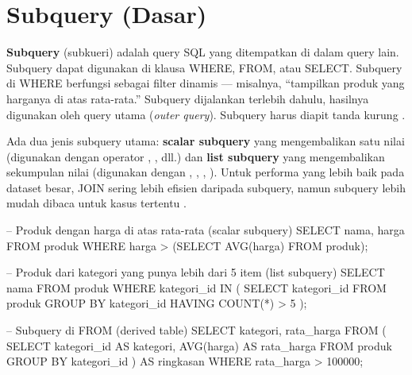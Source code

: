 \section{Subquery (Dasar)}

\textbf{Subquery} (subkueri) adalah query SQL yang ditempatkan di dalam query lain. Subquery dapat digunakan di klausa WHERE, FROM, atau SELECT. Subquery di WHERE berfungsi sebagai filter dinamis --- misalnya, ``tampilkan produk yang harganya di atas rata-rata.'' Subquery dijalankan terlebih dahulu, hasilnya digunakan oleh query utama (\textit{outer query}). Subquery harus diapit tanda kurung \cite{mysqlDocs}.

Ada dua jenis subquery utama: \textbf{scalar subquery} yang mengembalikan satu nilai (digunakan dengan operator \code{=}, \code{>}, dll.) dan \textbf{list subquery} yang mengembalikan sekumpulan nilai (digunakan dengan , , , ). Untuk performa yang lebih baik pada dataset besar, JOIN sering lebih efisien daripada subquery, namun subquery lebih mudah dibaca untuk kasus tertentu \cite{mysqlGettingStarted}.

\begin{webcode}[language=SQL, caption={Contoh subquery}]
-- Produk dengan harga di atas rata-rata (scalar subquery)
SELECT nama, harga FROM produk
WHERE harga > (SELECT AVG(harga) FROM produk);

-- Produk dari kategori yang punya lebih dari 5 item (list subquery)
SELECT nama FROM produk
WHERE kategori_id IN (
  SELECT kategori_id FROM produk
  GROUP BY kategori_id HAVING COUNT(*) > 5
);

-- Subquery di FROM (derived table)
SELECT kategori, rata_harga
FROM (
  SELECT kategori_id AS kategori, AVG(harga) AS rata_harga
  FROM produk GROUP BY kategori_id
) AS ringkasan
WHERE rata_harga > 100000;
\end{webcode}

